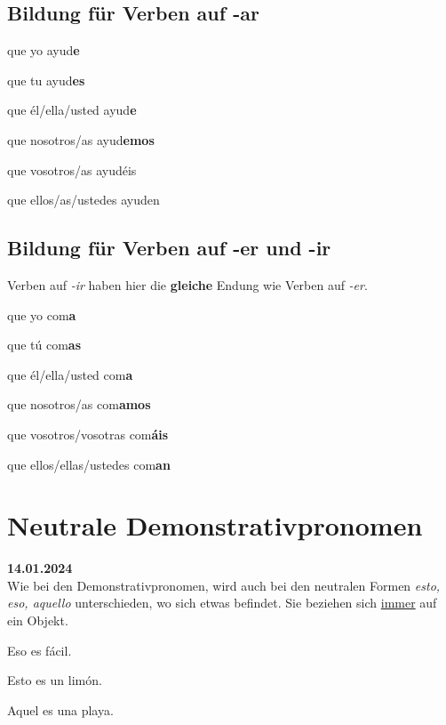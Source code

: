 \subsection*{Bildung für Verben auf -ar}
\begin{gramatica}
    \item que yo ayud\textbf{e}
    \item que tu ayud\textbf{es}
    \item que \'el/ella/usted ayud\textbf{e}
    \item que nosotros/as ayud\textbf{emos}
    \item que vosotros/as ayud\'eis
    \item que ellos/as/ustedes ayuden
\end{gramatica}
\subsection*{Bildung für Verben auf -er und -ir}
Verben auf \textit{-ir} haben hier die \textbf{gleiche}
Endung wie Verben auf \textit{-er}.
\begin{gramatica}
    \item que yo com\textbf{a}
    \item que t\'u com\textbf{as}
    \item que \'el/ella/usted com\textbf{a}
    \item que nosotros/as com\textbf{amos}
    \item que vosotros/vosotras com\textbf{\'ais}
    \item que ellos/ellas/ustedes com\textbf{an}
\end{gramatica}
\section{Neutrale Demonstrativpronomen}
\textbf{14.01.2024}\\
Wie bei den Demonstrativpronomen, wird auch bei den neutralen 
Formen \textit{esto, eso, aquello} unterschieden, wo sich etwas
befindet. Sie beziehen sich \underline{immer} auf ein Objekt.
\begin{ejemplos}
    \item Eso es f\'acil.
    \item Esto es un lim\'on.
    \item Aquel es una playa.
\end{ejemplos}
